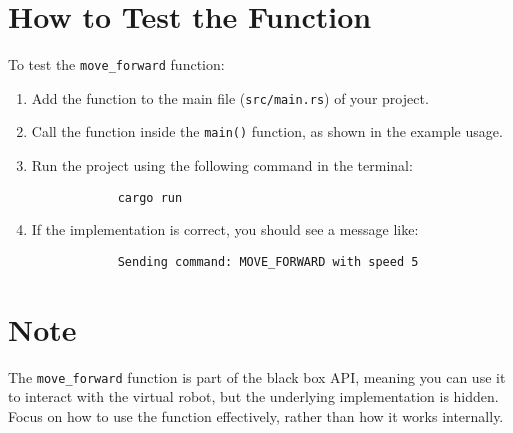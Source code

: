 \documentclass{article}
\begin{document}
	\section*{How to Test the Function}
	To test the \texttt{move\_forward} function:
	\begin{enumerate}
		\item Add the function to the main file (\texttt{src/main.rs}) of your project.
		\item Call the function inside the \texttt{main()} function, as shown in the example usage.
		\item Run the project using the following command in the terminal:
		\begin{lstlisting}
			cargo run
		\end{lstlisting}
		\item If the implementation is correct, you should see a message like:
		\begin{lstlisting}
			Sending command: MOVE_FORWARD with speed 5
		\end{lstlisting}
	\end{enumerate}
	
	\section*{Note}
	The \texttt{move\_forward} function is part of the black box API, meaning you can use it to interact with the virtual robot, but the underlying implementation is hidden. Focus on how to use the function effectively, rather than how it works internally.
	
\end{document}
